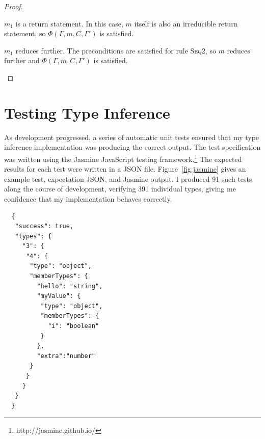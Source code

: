 \documentclass[12pt,a4paper,twoside,openright]{report}
\theoremstyle{definition}
\theoremstyle{dotless}
\newcommand{\indHyp}{\Phi(\Gamma, m, C, \Gamma')}
\begin{document}
\begin{proof}
\begin{case}[SeqTypable]
	\begin{subcase}
	  $m_1$ is a return statement.
	  In this case, $m$ itself is also an irreducible return statement, so
	  $\indHyp$ is satisfied. 
	\end{subcase}

	\begin{subcase}
	  $m_1$ reduces further.
	  The preconditions are satisfied for rule \textsc{Seq2}, so $m$ reduces
	  further and $\indHyp$ is satisfied.
	\end{subcase}

  \end{case}
\end{proof}


\section{Testing Type Inference}

As development progressed, a series of automatic unit tests ensured that my
type inference implementation was producing the correct output.  The test
specification was written using the Jasmine JavaScript testing
framework.\footnote{http://jasmine.github.io/} The expected results for each
test were written in a JSON file. Figure~\ref{fig:jasmine} gives an example
test, expectation JSON, and Jasmine output. I produced 91 such tests along the
course of development, verifying 391 individual types, giving me confidence
that my implementation behaves correctly.

\newsavebox{\testbox}
\begin{lrbox}{\testbox}
\begin{minipage}[c]{75mm}
  \begin{verbatim}
  {
   "success": true,
   "types": {
     "3": {
      "4": {
       "type": "object",
       "memberTypes": {
         "hello": "string",
         "myValue": {
          "type": "object",
          "memberTypes": {
            "i": "boolean"
          }
         },
         "extra":"number"
       }
      }
     }
   }
  }
\end{verbatim}
\end{minipage}
\end{lrbox}
\end{document}
